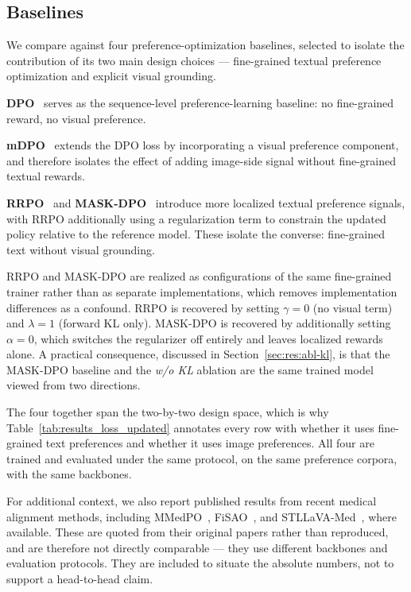\subsection{Baselines}
\label{sec:exp:baselines}

We compare \ourloss{} against four preference-optimization baselines, selected to isolate the contribution of its two main design choices --- fine-grained textual preference optimization and explicit visual grounding.

\textbf{DPO}~\cite{rafailov2023direct} serves as the sequence-level preference-learning baseline: no fine-grained reward, no visual preference.

\textbf{mDPO}~\cite{wang2024mdpo} extends the DPO loss by incorporating a visual preference component, and therefore isolates the effect of adding image-side signal without fine-grained textual rewards.

\textbf{RRPO}~\cite{sarkar2025self} and \textbf{MASK-DPO}~\cite{gu2025mask} introduce more localized textual preference signals, with RRPO additionally using a regularization term to constrain the updated policy relative to the reference model. These isolate the converse: fine-grained text without visual grounding.

RRPO and MASK-DPO are realized as configurations of the same fine-grained trainer rather than as separate implementations, which removes implementation differences as a confound. RRPO is recovered by setting $\gamma = 0$ (no visual term) and $\lambda = 1$ (forward KL only). MASK-DPO is recovered by additionally setting $\alpha = 0$, which switches the regularizer off entirely and leaves localized rewards alone. A practical consequence, discussed in Section~\ref{sec:res:abl-kl}, is that the MASK-DPO baseline and the \emph{w/o KL} ablation are the same trained model viewed from two directions.

The four together span the two-by-two design space, which is why Table~\ref{tab:results_loss_updated} annotates every row with whether it uses fine-grained text preferences and whether it uses image preferences. All four are trained and evaluated under the same protocol, on the same preference corpora, with the same backbones.

For additional context, we also report published results from recent medical alignment methods, including MMedPO~\cite{zhu2024mmedpo}, FiSAO~\cite{cui2024fine}, and STLLaVA-Med~\cite{sun2024self}, where available. These are quoted from their original papers rather than reproduced, and are therefore not directly comparable --- they use different backbones and evaluation protocols. They are included to situate the absolute numbers, not to support a head-to-head claim.

